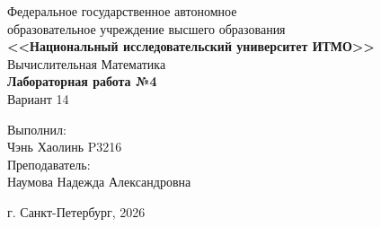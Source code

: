\begin{titlepage}
    \centering
    Федеральное государственное автономное \\
    образовательное учреждение высшего образования \\
    \textbf{<<Национальный исследовательский университет ИТМО>>} \\

    \vfill
    Вычислительная Математика \\
    \vspace{0.5\baselineskip}
    \textbf{Лабораторная работа №4} \\
    \vspace{0.5\baselineskip}
    Вариант 14 \\

    \vfill

    \flushright
    Выполнил:\\ 
    Чэнь Хаолинь P3216\\
    Преподаватель:\\
    Наумова Надежда Александровна\\

    \vspace{4\baselineskip}
    
    \centering
    г. Санкт-Петербург, 2026

\end{titlepage}
